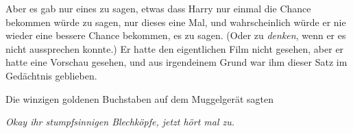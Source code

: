 Aber es gab nur eines zu sagen, etwas dass Harry nur einmal die Chance bekommen würde zu sagen, nur dieses eine Mal, und wahrscheinlich würde er nie wieder eine bessere Chance bekommen, es zu sagen. (Oder zu \emph{denken}, wenn er es nicht aussprechen konnte.) Er hatte den eigentlichen Film nicht gesehen, aber er hatte eine Vorschau gesehen, und aus irgendeinem Grund war ihm dieser Satz im Gedächtnis geblieben.

Die winzigen goldenen Buchstaben auf dem Muggelgerät sagten

\emph{Okay ihr stumpfsinnigen Blechköpfe, jetzt hört mal zu.}

